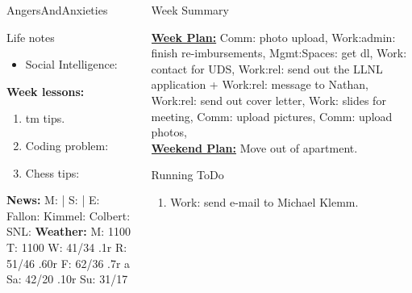 \begin{columns}
\begin{column}{0.10\linewidth}
\begin{block}{AngersAndAnxieties}
\begin{itemize}
      \end{itemize}
    \end{block}
      \begin{block}{Life notes}
        \begin{itemize}
          \tiny \item \tiny Social Intelligence: 
        \end{itemize}
      \end{block}
      \begin{block}
        {\tiny {\bf Week lessons:}}
        \begin{enumerate}
        \item \tiny tm tips.
        \item \tiny Coding problem: 
        \item \tiny Chess tips: 
        \end{enumerate}
            {{\tiny {\tiny \bf  News:}} {\tiny  M:  | S: 
                | E: Fallon:  Kimmel:  Colbert: SNL:}}
            {{\tiny {\tiny \bf  Weather:}} {\tiny M: 1100 T: 1100 W: 41/34 .1r 
                 R: 51/46 .60r F: 62/36 .7r a Sa: 42/20 .10r Su: 31/17 }} 

      \end{block}
  \end{column}
  \begin{column}{0.6\linewidth}
    \begin{block}{Week Summary} 

      {\underline {\bf Week Plan:}  Comm: photo upload, Work:admin:
        finish re-imbursements, Mgmt:Spaces: get dl, Work: contact for
        UDS, Work:rel: send out the LLNL application + Work:rel:
        message to Nathan, Work:rel: send out cover letter, Work:
        slides for meeting, Comm: upload pictures, Comm: upload
        photos, }\\ 


{\underline{\bf Weekend Plan:} Move out of apartment. } \\

    \end{block}
    \begin{block}{Running ToDo} %
      
      \begin{enumerate}
      \item \tiny Work: send e-mail to Michael Klemm. 


\end{enumerate}
\end{block}
\end{column}
\end{columns}
